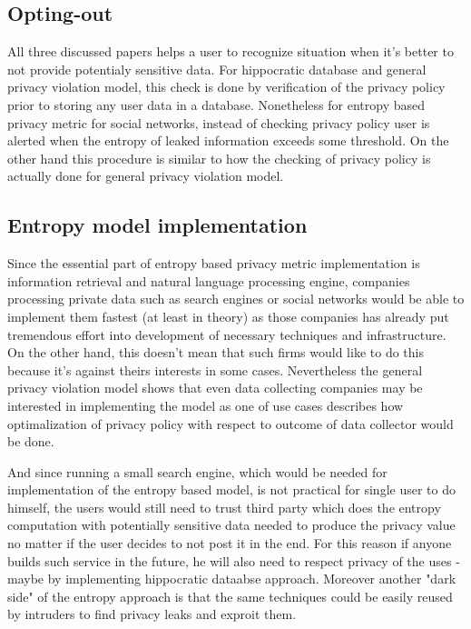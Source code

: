 \documentclass[a4paper]{article}
\begin{document}
\subsection{Opting-out}
All three discussed papers helps a user to recognize situation when it's better
to not provide potentialy sensitive data.
For hippocratic database and general privacy violation model, this check is
done by verification of the privacy policy prior to storing any user data in a
database.
Nonetheless for entropy based privacy metric for social networks, instead of
checking privacy policy user is alerted when the entropy of leaked information
exceeds some threshold. On the other hand this procedure is similar to how the
checking of privacy policy is actually done for general privacy violation model.


\subsection{Entropy model implementation}

Since the essential part of entropy based privacy metric implementation is
information retrieval and natural language processing engine,
companies processing private data such as search engines or social networks
would be able to implement them fastest (at least in theory)
as those companies has already put tremendous effort into development of
necessary techniques and infrastructure. On the other hand, this doesn't mean
that such firms would like to do this because it's against theirs interests in
some cases. Nevertheless the general privacy violation model shows that even
data collecting companies may be interested in implementing the model as one of
use cases describes how optimalization of privacy policy with respect to
outcome of data collector would be done.

And since running a small search engine, which would be needed for
implementation of the entropy based model, is not practical for single user to
do himself, the users would still need to trust third party which does the
entropy computation with potentially sensitive data needed to produce the
privacy value no matter if the user decides to not post it in the end.
For this reason if anyone builds such service in the future, he will also need
to respect privacy of the uses - maybe by implementing hippocratic dataabse
approach.
Moreover another "dark side" of the entropy approach is that the same techniques could be easily reused by intruders to find privacy leaks and exproit them.



\end{document}
